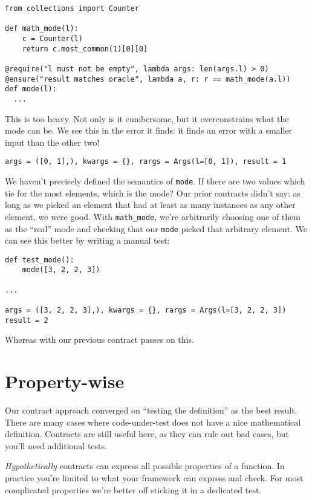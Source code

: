 \begin{verbatim}
from collections import Counter

def math_mode(l):
    c = Counter(l)
    return c.most_common(1)[0][0]

@require("l must not be empty", lambda args: len(args.l) > 0)
@ensure("result matches oracle", lambda a, r: r == math_mode(a.l))
def mode(l):
  ...
\end{verbatim}
This is too heavy. Not only is it cumbersome, but it overconstrains what
the mode can be. We see this in the error it finds: it finds an error
with a smaller input than the other two!

\begin{verbatim}
args = ([0, 1],), kwargs = {}, rargs = Args(l=[0, 1]), result = 1
\end{verbatim}
We haven't precisely defined the semantics of \texttt{mode}. If there
are two values which tie for the most elements, which is the mode? Our
prior contracts didn't say: as long as we picked an element that had at
least as many instances as any other element, we were good. With
\texttt{math\_mode}, we're arbitrarily choosing one of them as the
``real'' mode and checking that our \texttt{mode} picked that arbitrary
element. We can see this better by writing a manual test:

\begin{verbatim}
def test_mode():
    mode([3, 2, 2, 3])

...

args = ([3, 2, 2, 3],), kwargs = {}, rargs = Args(l=[3, 2, 2, 3])
result = 2
\end{verbatim}
Whereas with our previous contract passes on this.

\section{Property-wise}\label{property-wise}

Our contract approach converged on ``testing the definition'' as the
best result. There are many cases where code-under-test does not have a
nice mathematical definition. Contracts are still useful here, as they
can rule out bad cases, but you'll need additional tests.

\emph{Hypothetically} contracts can express all possible properties of a
function. In practice you're limited to what your framework can express
and check. For most complicated properties we're better off sticking it
in a dedicated test.

